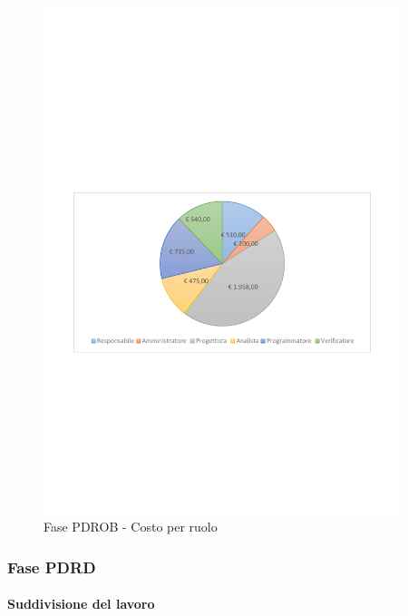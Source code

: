 \documentclass[../PianoProgetto.tex]{subfiles}
\begin{document}
\vfill	
	\begin{figure}[!h]
		\centering
		\includegraphics[width=0.93\textwidth , trim=2cm 9.5cm 2cm 11cm]{grafici/PDROB/PDROB-costo}
			\caption{Fase PDROB - Costo per ruolo}
		\label{fig:CircleChart-fasePDROB_costo}
	\end{figure}
\vfill	
\newpage	
	
	\subsubsection{Fase PDRD}
				\paragraph{Suddivisione del lavoro}
						
\end{document}
